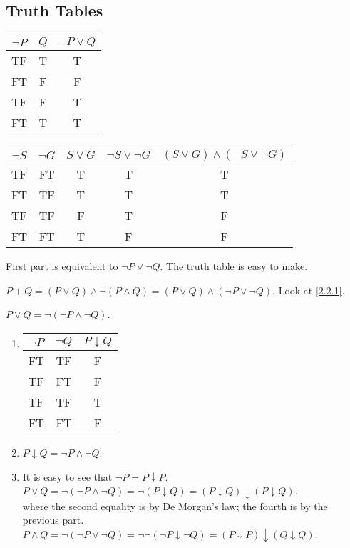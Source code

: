 \subsection{Truth Tables}
\begin{exx} \label{2.2.1}
  \begin{tabular}{c c c}
    $\lnot P$ & $Q$ & $\lnot P \lor Q$ \\
    \hline
    TF & T & T \\
    FT & F & F\\
    TF & F & T\\
    FT & T & T
  \end{tabular}
  \begin{tabular}{c c c c c}
    $\lnot S$ & $\lnot G$ & $S\lor G$ & $\lnot S\lor \lnot G$ & $(S\lor G)\land(\lnot S\lor \lnot G)$ \\
    \hline
    TF & FT & T & T & T \\
    FT & TF & T & T & T \\
    TF & TF & F & T & F \\
    FT & FT & T & F & F
  \end{tabular}
\end{exx}

\begin{exx}
  First part is equivalent to $\lnot P\lor \lnot Q$. The truth table is easy to make.
\end{exx}

\begin{exx}
    $P+Q = (P\lor Q)\land\lnot(P\land Q) = (P\lor Q)\land(\lnot P\lor \lnot Q)$.
    Look at \autoref{2.2.1}.
\end{exx}

\begin{exx}
  $P\lor Q=\lnot(\lnot P\land \lnot Q)$.
\end{exx}

\begin{exx}
  \begin{enumerate}[label=(\alph*)]
    \item \begin{tabular}{c c c}
      $\lnot P$ & $\lnot Q$ & $P\downarrow Q$ \\
      \hline
      FT & TF & F \\
      TF & FT & F \\
      TF & TF & T \\
      FT & FT & F
    \end{tabular}
    \item $P\downarrow Q = \lnot P \land \lnot Q$.
    \item It is easy to see that
    \newline $\lnot P=P\downarrow P$.
    \newline $P\lor Q=\lnot(\lnot P\land \lnot Q)=\lnot(P\downarrow Q)=(P\downarrow Q)\downarrow(P\downarrow Q)$.\\
    where the second equality is by De Morgan's law; the fourth is by the previous part.
    \newline $P\land Q=\lnot(\lnot P \lor \lnot Q)=\lnot\lnot(\lnot P \downarrow \lnot Q)=(P\downarrow P)\downarrow(Q\downarrow Q)$.
  \end{enumerate}
\end{exx}

